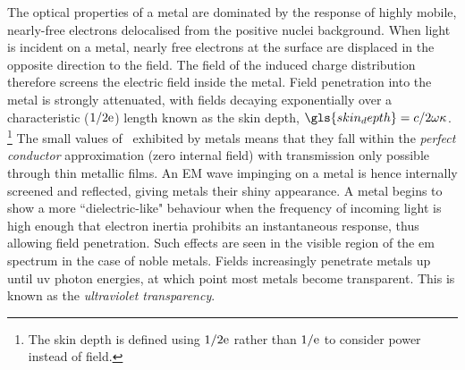 \documentclass{article}
\begin{document}
The optical properties of a metal are dominated by the response of highly mobile, nearly-free electrons delocalised from the positive nuclei background. When light is incident on a metal, nearly free electrons at the surface are displaced in the opposite direction to the field. The field of the induced charge distribution therefore screens the electric field inside the metal. Field penetration into the metal is strongly attenuated, with fields decaying exponentially over a characteristic ($1/2\mathrm{e}$) length known as the skin depth, $\gls{skin_depth} = c/2\omega\kappa$.%
\footnote{The skin depth is defined using $1/2\mathrm{e}$ rather than $1/\mathrm{e}$ to consider power instead of field.}
The small values of \skindepth\ exhibited by metals means that they fall within the \textit{perfect conductor} approximation (zero internal field) with transmission only possible through thin metallic films. An EM wave impinging on a metal is hence internally screened and reflected, giving metals their shiny appearance. A metal begins to show a more ``dielectric-like" behaviour when the frequency of incoming light is high enough that electron inertia prohibits an instantaneous response, thus allowing field penetration. Such effects are seen in the visible region of the \gls{em} spectrum in the case of noble metals. Fields increasingly penetrate metals up until \gls{uv} photon energies, at which point most metals become transparent. This is known as the \textit{ultraviolet transparency}.
\end{document}
